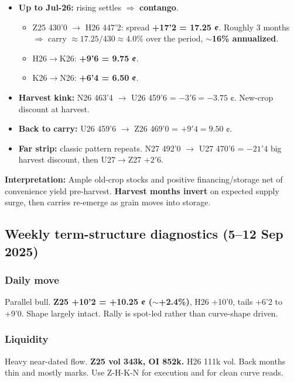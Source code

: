 \documentclass[11pt,a4paper]{article} %
\begin{document}
\begin{itemize}
  \item \textbf{Up to Jul-26:} rising settles $\Rightarrow$ \textbf{contango}.
    \begin{itemize}
      \item Z25 430'0 $\rightarrow$ H26 447'2: spread \textbf{+17'2 = 17.25 ¢}. Roughly 3 months $\Rightarrow$ carry $\approx 17.25/430 \approx 4.0\%$ over the period, \textbf{$\sim$16\% annualized}.
      \item H26$\rightarrow$K26: \textbf{+9'6 = 9.75 ¢}.
      \item K26$\rightarrow$N26: \textbf{+6'4 = 6.50 ¢}.
    \end{itemize}
  \item \textbf{Harvest kink:} N26 463'4 $\rightarrow$ U26 459'6 = $-3'6 = -3.75$ ¢. New-crop discount at harvest.
  \item \textbf{Back to carry:} U26 459'6 $\rightarrow$ Z26 469'0 = $+9'4 = 9.50$ ¢.
  \item \textbf{Far strip:} classic pattern repeats. N27 492'0 $\rightarrow$ U27 470'6 = $-21'4$ big harvest discount, then U27$\rightarrow$Z27 $+2'6$.
\end{itemize}

\textbf{Interpretation:} Ample old-crop stocks and positive financing/storage net of convenience yield pre-harvest. \textbf{Harvest months invert} on expected supply surge, then carries re-emerge as grain moves into storage.


\subsection{Weekly term-structure diagnostics (5–12 Sep 2025)}

\subsubsection*{Daily move}

Parallel bull. \textbf{Z25 +10'2 = +10.25 ¢ ($\sim$+2.4\%)}, H26 +10'0, tails +6'2 to +9'0. Shape largely intact. Rally is spot-led rather than curve-shape driven.

\subsubsection*{Liquidity}

Heavy near-dated flow. \textbf{Z25 vol 343k, OI 852k.} H26 111k vol. Back months thin and mostly marks. Use Z-H-K-N for execution and for clean curve reads.
\end{document}
